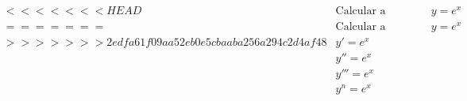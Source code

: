 \begin{ex}
\begin{align}
<<<<<<< HEAD
&\text{Calcular a n'�sima derivada de}\quad y=e^{x}\nonumber\\
=======
&\text{Calcular a n'�sima derivada de}\quad y=e^{x}\nonumber\\
>>>>>>> 2edfa61f09aa52eb0e5cbaaba256a294c2d4af48
&y'=e^{x}\nonumber\\
&y''=e^{x}\nonumber\\
&y'''=e^{x}\nonumber\\
&y^{n}=e^{x}\nonumber
\end{align}
\end{ex}
